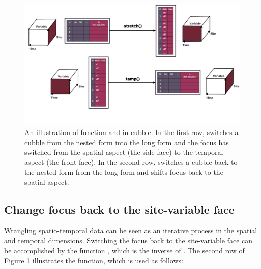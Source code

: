\documentclass[
]{jss}
\begin{document}
\begin{CodeChunk}
\begin{figure}

{\centering \includegraphics[width=1\linewidth]{../figures/diagram-keynotes/diagram-keynotes.001} 

}

\caption{An illustration of function  and  in cubble. In the first row,  switches a cubble from the nested form into the long form and the focus has switched from the spatial aspect (the side face) to the temporal aspect (the front face). In the second row,  switches a cubble back to the nested form from the long form and shifts focus back to the spatial aspect.}\label{fig:face}
\end{figure}
\end{CodeChunk}

\hypertarget{change-focus-back-to-the-site-variable-face}{%
\subsection{Change focus back to the site-variable face}\label{change-focus-back-to-the-site-variable-face}}

Wrangling spatio-temporal data can be seen as an iterative process in the spatial and temporal dimensions. Switching the focus back to the site-variable face can be accomplished by the function , which is the inverse of . The second row of Figure \ref{fig:face} illustrates the function, which is used as follows:
\end{document}
